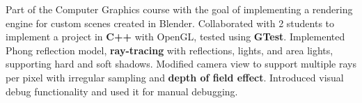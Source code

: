     \vspace{-4pt}
    \small{\newline{} Part of the Computer Graphics course with the goal of implementing a rendering engine for custom scenes created in Blender.}
    \vspace{-4pt}
    \resumeItemListStart
        \subItemOfItem
        {Collaborated with 2 students to implement a project in \textbf{C++} with OpenGL, tested using \textbf{GTest}.}
        \subItemOfItem
        {Implemented Phong reflection model, \textbf{ray-tracing} with reflections, lights, and area lights, supporting hard and soft shadows.}
        \subItemOfItem
        {Modified camera view to support multiple rays per pixel with irregular sampling and \textbf{depth of field effect}.}
        \subItemOfItem
        {Introduced visual debug functionality and used it for manual debugging.}
    \resumeItemListEnd